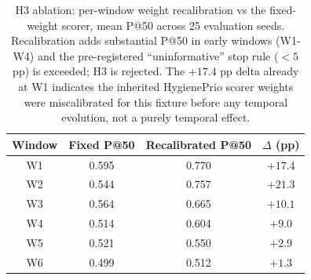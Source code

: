 \begin{table}[t]
\centering
\caption{H3 ablation: per-window weight recalibration vs the fixed-weight scorer, mean P@50 across 25 evaluation seeds. Recalibration adds substantial P@50 in early windows (W1-W4) and the pre-registered ``uninformative'' stop rule ($<\!5$ pp) is exceeded; H3 is rejected. The $+17.4$ pp delta already at W1 indicates the inherited HygienePrio scorer weights were miscalibrated for this fixture before any temporal evolution, not a purely temporal effect.}
\label{tab:recalibration}
\setlength{\tabcolsep}{4pt}
\small
\begin{tabular}{cccc}
\toprule
Window & Fixed P@50 & Recalibrated P@50 & $\Delta$ (pp) \\
\midrule
W1 & 0.595 & 0.770 & $+17.4$ \\
W2 & 0.544 & 0.757 & $+21.3$ \\
W3 & 0.564 & 0.665 & $+10.1$ \\
W4 & 0.514 & 0.604 & $+9.0$ \\
W5 & 0.521 & 0.550 & $+2.9$ \\
W6 & 0.499 & 0.512 & $+1.3$ \\
\bottomrule
\end{tabular}
\end{table}
